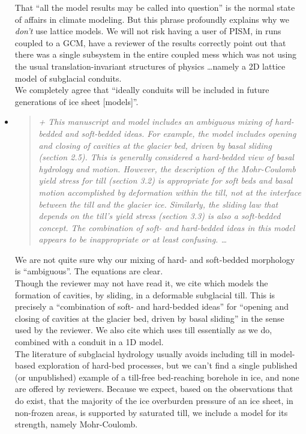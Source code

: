 \documentclass[11pt,reqno]{amsart}
\newcommand{\reply}[2]{
\medskip\medskip
\item  \begin{quote}
\emph{#1}
\end{quote}

\medskip
\noindent #2}
\begin{document}
\begin{itemize}
{\indent That ``all the model results may be called into question'' is the normal state of affairs in climate modeling.  But this phrase profoundly explains why we \emph{don't} use lattice models.  We will not risk having a user of PISM, in runs coupled to a GCM, have a reviewer of the results correctly point out that there was a single subsystem in the entire coupled mess which was not using the usual translation-invariant structures of physics \dots namely a 2D lattice model of subglacial conduits.\\
\indent We completely agree that ``ideally conduits will be included in future
generations of ice sheet [models]''.}

\reply{+ This manuscript and model includes an ambiguous mixing of hard-bedded and soft-bedded ideas. For example, the model includes opening and closing of cavities at
the glacier bed, driven by basal sliding (section 2.5).  This is generally considered
a hard-bedded view of basal hydrology and motion.  However, the description of the
Mohr-Coulomb yield stress for till (section 3.2) is appropriate for soft beds and basal
motion accomplished by deformation \emph{within} the till, not at the interface between the
till and the glacier ice. Similarly, the sliding law that depends on the till's yield stress
(section 3.3) is also a soft-bedded concept. The combination of soft- and hard-bedded
ideas in this model appears to be inappropriate or at least confusing. \dots}
{We are not quite sure why our mixing of hard- and soft-bedded morphology is ``ambiguous''.  The equations are clear.\\
\indent Though the reviewer may not have read it, we cite \cite{Schoof2007deformable} which models the formation of cavities, by sliding, in a deformable subglacial till.  This is precisely a ``combination of soft- and hard-bedded ideas'' for ``opening and closing of cavities at the glacier bed, driven by basal sliding'' in the sense used by the reviewer.  We also cite \cite{vanderWeletal2013} which uses till essentially as we do, combined with a conduit in a 1D model. \\
\indent The literature of subglacial hydrology usually avoids including till in model-based exploration of hard-bed processes, but we can't find a single published (or unpublished) example of a till-free bed-reaching borehole in ice, and none are offered by reviewers.  Because we expect, based on the observations that do exist, that the majority of the ice overburden pressure of an ice sheet, in non-frozen areas, is supported by saturated till, we include a model for its strength, namely Mohr-Coulomb. \\
}
\end{itemize}
\end{document}
